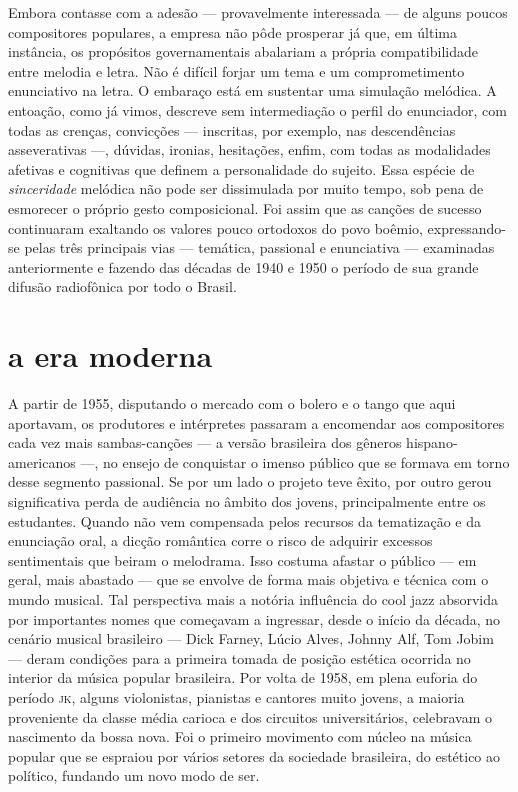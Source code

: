 Embora contasse com a adesão --- provavelmente interessada --- de alguns
poucos compositores populares, a empresa não pôde prosperar já que, em
última instância, os propósitos governamentais abalariam a própria
compatibilidade entre melodia e letra. Não é difícil forjar um tema e um
comprometimento enunciativo na letra. O embaraço está em sustentar uma
simulação melódica. A entoação, como já vimos, descreve sem
intermediação o perfil do enunciador, com todas as crenças, convicções
--- inscritas, por exemplo, nas descendências asseverativas ---, dúvidas,
ironias, hesitações, enfim, com todas as modalidades afetivas e
cognitivas que definem a personalidade do sujeito. Essa espécie de
\textit{sinceridade} melódica não pode ser dissimulada por muito tempo, sob
pena de esmorecer o próprio gesto composicional. Foi assim que as
canções de sucesso continuaram exaltando os valores pouco ortodoxos do
povo boêmio, expressando-se pelas três principais vias --- temática,
passional e enunciativa --- examinadas anteriormente e fazendo das
décadas de 1940 e 1950 o período de sua grande difusão radiofônica por
todo o Brasil.

\section{a era moderna}

A partir de 1955, disputando o mercado com o bolero e o tango que aqui
aportavam, os produtores e intérpretes passaram a encomendar aos
compositores cada vez mais sambas-canções --- a versão brasileira dos gêneros
hispano-americanos ---, no ensejo de conquistar o imenso público que se
formava em torno desse segmento passional. Se por um lado o projeto teve
êxito, por outro gerou significativa perda de audiência no âmbito dos
jovens, principalmente entre os estudantes. Quando não vem compensada
pelos recursos da tematização e da enunciação oral, a dicção romântica
corre o risco de adquirir excessos sentimentais que beiram o melodrama.
Isso costuma afastar o público --- em geral, mais abastado --- que se
envolve de forma mais objetiva e técnica com o mundo musical. Tal
perspectiva mais a notória influência do cool jazz absorvida por
importantes nomes que começavam a ingressar, desde o início da década,
no cenário musical brasileiro --- Dick Farney, Lúcio Alves, Johnny Alf, Tom
Jobim --- deram condições para a primeira tomada de posição estética
ocorrida no interior da música popular brasileira. Por volta de 1958, em
plena euforia do período \textsc{jk}, alguns violonistas, pianistas e cantores
muito jovens, a maioria proveniente da classe média carioca e dos
circuitos universitários, celebravam o nascimento da bossa nova. Foi o
primeiro movimento com núcleo na música popular que se espraiou por
vários setores da sociedade brasileira, do estético ao político,
fundando um novo modo de ser.

